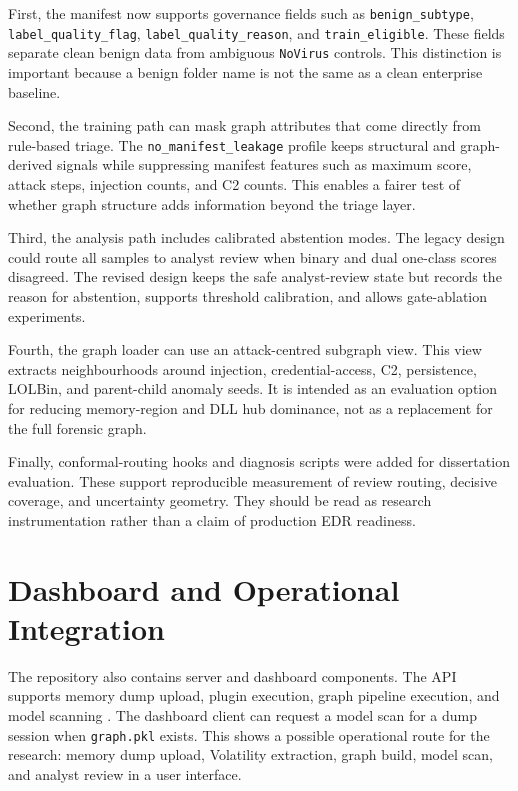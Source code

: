 First, the manifest now supports governance fields such as \texttt{benign\_subtype}, \texttt{label\_quality\_flag}, \texttt{label\_quality\_reason}, and \texttt{train\_eligible}. These fields separate clean benign data from ambiguous \texttt{NoVirus} controls. This distinction is important because a benign folder name is not the same as a clean enterprise baseline.

Second, the training path can mask graph attributes that come directly from rule-based triage. The \texttt{no\_manifest\_leakage} profile keeps structural and graph-derived signals while suppressing manifest features such as maximum score, attack steps, injection counts, and C2 counts. This enables a fairer test of whether graph structure adds information beyond the triage layer.

Third, the analysis path includes calibrated abstention modes. The legacy design could route all samples to analyst review when binary and dual one-class scores disagreed. The revised design keeps the safe analyst-review state but records the reason for abstention, supports threshold calibration, and allows gate-ablation experiments.

Fourth, the graph loader can use an attack-centred subgraph view. This view extracts neighbourhoods around injection, credential-access, C2, persistence, LOLBin, and parent-child anomaly seeds. It is intended as an evaluation option for reducing memory-region and DLL hub dominance, not as a replacement for the full forensic graph.

Finally, conformal-routing hooks and diagnosis scripts were added for dissertation evaluation. These support reproducible measurement of review routing, decisive coverage, and uncertainty geometry. They should be read as research instrumentation rather than a claim of production EDR readiness.

\section{Dashboard and Operational Integration}

The repository also contains server and dashboard components. The API supports memory dump upload, plugin execution, graph pipeline execution, and model scanning \cite{fastapi2026docs}. The dashboard client can request a model scan for a dump session when \texttt{graph.pkl} exists. This shows a possible operational route for the research: memory dump upload, Volatility extraction, graph build, model scan, and analyst review in a user interface.

